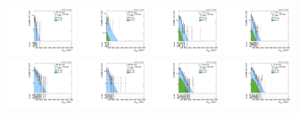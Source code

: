 \begin{figure}[htbp]
  \includegraphics[width=0.18\textwidth]{fig/fitValidation/PostFit_SR_MVV_MJJ110to150__mu_HP_vbf_LDy_Run2.pdf}
  \includegraphics[width=0.18\textwidth]{fig/fitValidation/PostFit_SR_MVV_MJJ110to150__e_HP_vbf_LDy_Run2.pdf}
  \includegraphics[width=0.18\textwidth]{fig/fitValidation/PostFit_SR_MVV_MJJ110to150__mu_LP_vbf_LDy_Run2.pdf}
  \includegraphics[width=0.18\textwidth]{fig/fitValidation/PostFit_SR_MVV_MJJ110to150__e_LP_vbf_LDy_Run2.pdf}\\
  \includegraphics[width=0.18\textwidth]{fig/fitValidation/PostFit_SR_MVV_MJJ110to150__mu_HP_bb_HDy_Run2.pdf}
  \includegraphics[width=0.18\textwidth]{fig/fitValidation/PostFit_SR_MVV_MJJ110to150__e_HP_bb_HDy_Run2.pdf}
  \includegraphics[width=0.18\textwidth]{fig/fitValidation/PostFit_SR_MVV_MJJ110to150__mu_LP_bb_HDy_Run2.pdf}
  \includegraphics[width=0.18\textwidth]{fig/fitValidation/PostFit_SR_MVV_MJJ110to150__e_LP_bb_HDy_Run2.pdf}\\

\end{figure}
